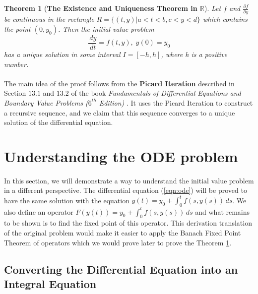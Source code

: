 \documentclass{article}
\newtheorem{theorem}{Theorem}[section]
\theoremstyle{definition}
\theoremstyle{remark}
\theoremstyle{example}
\begin{document}
\begin{theorem}[\textbf{The Existence and Uniqueness Theorem in $\mathbb{R}$}] \cite{r_kent_nagle_fundamentals_2011}
\label{thm:EUT}
Let $f$ and $\tfrac{\partial f}{\partial y}$ be continuous in the rectangle $R = \{(t,y)|a < t < b, c < y < d\}$ which contains the point $(0, y_0)$. Then the initial value problem
    \begin{equation}\label{eqn:ode}
        \dfrac{\,dy}{\,dt} = f(t,y),\; y(0) = y_0
    \end{equation}
has a unique solution in some interval $I = [-h, h]$, where h is a positive number.
\end{theorem}

\paragraph{  }
The main idea of the proof follows from the \textbf{Picard Iteration} described in Section $13.1$ and $13.2$ of the book \textit{Fundamentals of Differential Equations and Boundary Value Problems ($6^{th}$ Edition)} \cite{r_kent_nagle_fundamentals_2011}. It uses the Picard Iteration to construct a recursive sequence, and we claim that this sequence converges to a unique solution of the differential equation.

\section{Understanding the ODE problem}

\paragraph{  }

In this section, we will demonstrate a way to understand the initial value problem in a different perspective. The differential equation (\ref{eqn:ode}) will be proved to have the same solution with the equation $y(t) = y_0 + \int_{0}^{t}{f(s,y(s))}\,ds$. We also define an operator $F(y(t)) = y_0 + \int_{0}^{t}{f(s,y(s))}\,ds$ and what remains to be shown is to find the fixed point of this operator. This derivation translation of the original problem would make it easier to apply the Banach Fixed Point Theorem of operators which we would prove later to prove the Theorem \ref{thm:EUT}.

\subsection{Converting the Differential Equation into an Integral Equation} \label{sec:3.1}
\end{document}

